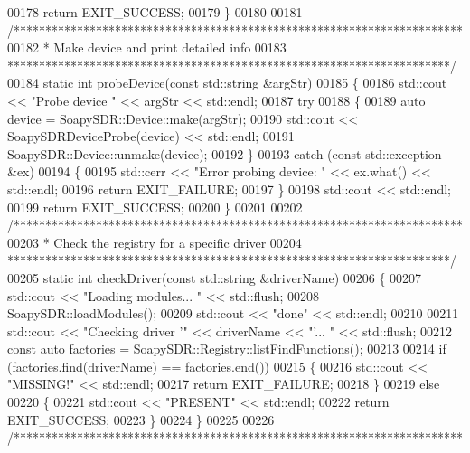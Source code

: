 \begin{DoxyCode}
00178     \textcolor{keywordflow}{return} EXIT\_SUCCESS;
00179 \}
00180 
00181 \textcolor{comment}{/***********************************************************************}
00182 \textcolor{comment}{ * Make device and print detailed info}
00183 \textcolor{comment}{ **********************************************************************/}
00184 \textcolor{keyword}{static} \textcolor{keywordtype}{int} probeDevice(\textcolor{keyword}{const} std::string &argStr)
00185 \{
00186     std::cout << \textcolor{stringliteral}{"Probe device "} << argStr << std::endl;
00187     \textcolor{keywordflow}{try}
00188     \{
00189         \textcolor{keyword}{auto} device = SoapySDR::Device::make(argStr);
00190         std::cout << SoapySDRDeviceProbe(device) << std::endl;
00191         SoapySDR::Device::unmake(device);
00192     \}
00193     \textcolor{keywordflow}{catch} (\textcolor{keyword}{const} std::exception &ex)
00194     \{
00195         std::cerr << \textcolor{stringliteral}{"Error probing device: "} << ex.what() << std::endl;
00196         \textcolor{keywordflow}{return} EXIT\_FAILURE;
00197     \}
00198     std::cout << std::endl;
00199     \textcolor{keywordflow}{return} EXIT\_SUCCESS;
00200 \}
00201 
00202 \textcolor{comment}{/***********************************************************************}
00203 \textcolor{comment}{ * Check the registry for a specific driver}
00204 \textcolor{comment}{ **********************************************************************/}
00205 \textcolor{keyword}{static} \textcolor{keywordtype}{int} checkDriver(\textcolor{keyword}{const} std::string &driverName)
00206 \{
00207     std::cout << \textcolor{stringliteral}{"Loading modules... "} << std::flush;
00208     SoapySDR::loadModules();
00209     std::cout << \textcolor{stringliteral}{"done"} << std::endl;
00210 
00211     std::cout << \textcolor{stringliteral}{"Checking driver '"} << driverName << \textcolor{stringliteral}{"'... "} << std::flush;
00212     \textcolor{keyword}{const} \textcolor{keyword}{auto} factories = SoapySDR::Registry::listFindFunctions();
00213 
00214     \textcolor{keywordflow}{if} (factories.find(driverName) == factories.end())
00215     \{
00216         std::cout << \textcolor{stringliteral}{"MISSING!"} << std::endl;
00217         \textcolor{keywordflow}{return} EXIT\_FAILURE;
00218     \}
00219     \textcolor{keywordflow}{else}
00220     \{
00221         std::cout << \textcolor{stringliteral}{"PRESENT"} << std::endl;
00222         \textcolor{keywordflow}{return} EXIT\_SUCCESS;
00223     \}
00224 \}
00225 
00226 \textcolor{comment}{/***********************************************************************}

\end{DoxyCode}
